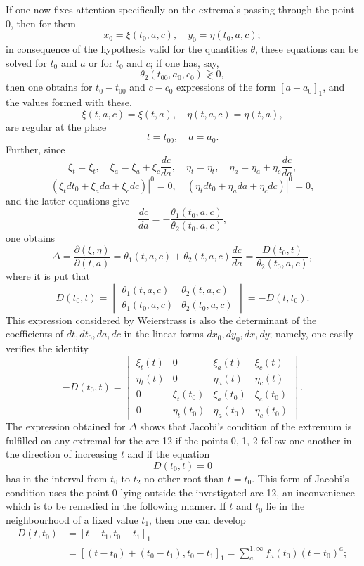 \documentclass[11pt,a4paper,leqno]{article}
\begin{document}
If one now fixes attention specifically on the extremals passing through the point 0, then for them
\[
x_0=\xi(t_0,a,c),
\quad
y_0=\eta(t_0,a,c);
\]
in consequence of the hypothesis valid for the quantities $\theta$, these equations can be solved for $t_0$ and $a$ or for $t_0$ and $c$; if one has, say,
\[
\theta_2(t_{00},a_0,c_0)\gtrless0,
\]
then one obtains for $t_0-t_{00}$ and $c-c_0$ expressions of the form $[a-a_0]_1$, and the values formed with these,
\[
\xi(t,a,c)=\xi(t,a),
\quad
\eta(t,a,c)=\eta(t,a),
\]
are regular at the place
\[
t=t_{00},
\quad
a=a_0.
\]
Further, since
\[
\xi_t=\xi_t,
\quad
\xi_a=\xi_a+\xi_c\frac{dc}{da},
\quad
\eta_t=\eta_t,
\quad
\eta_a=\eta_a+\eta_c\frac{dc}{da},
\]
\[
\left.(\xi_tdt_0+\xi_ada+\xi_cdc)\right|^0=0,
\quad
\left.(\eta_tdt_0+\eta_ada+\eta_cdc)\right|^0=0,
\]
and the latter equations give
\[
\frac{dc}{da}=-\frac{\theta_1(t_0,a,c)}{\theta_2(t_0,a,c)},
\]
one obtains
\[
\Delta=\frac{\partial(\xi,\eta)}{\partial(t,a)}
=\theta_1(t,a,c)+\theta_2(t,a,c)\frac{dc}{da}
=\frac{D(t_0,t)}{\theta_2(t_0,a,c)},
\]
where it is put that
\[
D(t_0,t)=
\begin{vmatrix}
\theta_1(t,a,c)&\theta_2(t,a,c)\\
\theta_1(t_0,a,c)&\theta_2(t_0,a,c)
\end{vmatrix}
=-D(t,t_0).
\]
This expression considered by Weierstrass is also the determinant of the coefficients of $dt,dt_0,da,dc$ in the linear forms $dx_0,dy_0,dx,dy$; namely, one easily verifies the identity
\[
-D(t_0,t)=
\begin{vmatrix}
\xi_t(t)&0&\xi_a(t)&\xi_c(t)\\
\eta_t(t)&0&\eta_a(t)&\eta_c(t)\\
0&\xi_t(t_0)&\xi_a(t_0)&\xi_c(t_0)\\
0&\eta_t(t_0)&\eta_a(t_0)&\eta_c(t_0)
\end{vmatrix}.
\]
The expression obtained for $\Delta$ shows that Jacobi's condition of the extremum is fulfilled on any extremal for the arc 12 if the points 0, 1, 2 follow one another in the direction of increasing $t$ and if the equation
\[
D(t_0,t)=0
\]
has in the interval from $t_0$ to $t_2$ no other root than $t=t_0$. This form of Jacobi's condition uses the point 0 lying outside the investigated arc 12, an inconvenience which is to be remedied in the following manner. If $t$ and $t_0$ lie in the neighbourhood of a fixed value $t_1$, then one can develop
\begin{equation}\tag{103}
\begin{aligned}
D(t,t_0)&=[t-t_1,t_0-t_1]_1\\
&=[(t-t_0)+(t_0-t_1),t_0-t_1]_1
=\sum_a^{1,\infty}f_a(t_0)(t-t_0)^a;
\end{aligned}
\end{equation}
\end{document}
